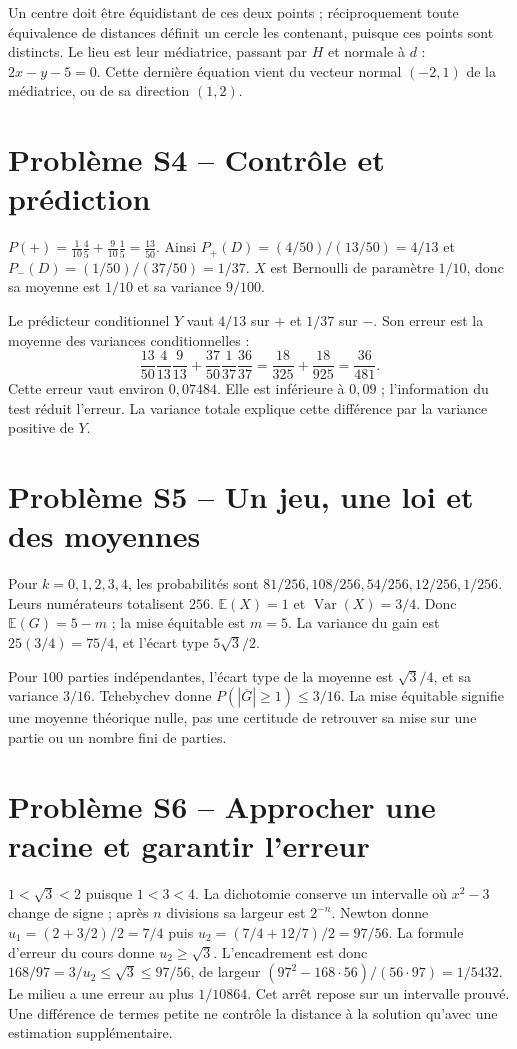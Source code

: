 Un centre doit être équidistant de ces deux points ; réciproquement toute
équivalence de distances définit un cercle les contenant, puisque ces points
sont distincts. Le lieu est leur médiatrice, passant par $H$ et normale à $d$ :
$2x-y-5=0$. Cette dernière équation vient du vecteur normal $(-2,1)$
de la médiatrice, ou de sa direction $(1,2)$.

\section*{Problème S4 -- Contrôle et prédiction}

$P(+)=\frac1{10}\frac45+\frac9{10}\frac15=\frac{13}{50}$.
Ainsi $P_+(D)=(4/50)/(13/50)=4/13$ et
$P_-(D)=(1/50)/(37/50)=1/37$.
$X$ est Bernoulli de paramètre $1/10$, donc sa moyenne est $1/10$
et sa variance $9/100$.

Le prédicteur conditionnel $Y$ vaut $4/13$ sur $+$ et $1/37$ sur $-$.
Son erreur est la moyenne des variances conditionnelles :
\[
\frac{13}{50}\frac4{13}\frac9{13}
+\frac{37}{50}\frac1{37}\frac{36}{37}
=\frac{18}{325}+\frac{18}{925}=\frac{36}{481}.
\]
Cette erreur vaut environ $0{,}07484$.
Elle est inférieure à $0{,}09$ ; l'information du test réduit l'erreur.
La variance totale explique cette différence par la variance positive de $Y$.

\section*{Problème S5 -- Un jeu, une loi et des moyennes}

Pour $k=0,1,2,3,4$, les probabilités sont
$81/256,108/256,54/256,12/256,1/256$.
Leurs numérateurs totalisent $256$.
$\mathbb E(X)=1$ et $\operatorname{Var}(X)=3/4$.
Donc $\mathbb E(G)=5-m$ ; la mise équitable est $m=5$.
La variance du gain est $25(3/4)=75/4$, et l'écart type $5\sqrt3/2$.

Pour $100$ parties indépendantes, l'écart type de la moyenne est
$\sqrt3/4$, et sa variance $3/16$.
Tchebychev donne $P(|\overline G|\ge1)\le3/16$.
La mise équitable signifie une moyenne théorique nulle, pas une certitude
de retrouver sa mise sur une partie ou un nombre fini de parties.

\section*{Problème S6 -- Approcher une racine et garantir l'erreur}

$1<\sqrt3<2$ puisque $1<3<4$. La dichotomie conserve un intervalle
où $x^2-3$ change de signe ; après $n$ divisions sa largeur est $2^{-n}$.
Newton donne $u_1=(2+3/2)/2=7/4$ puis
$u_2=(7/4+12/7)/2=97/56$.
La formule d'erreur du cours donne $u_2\ge\sqrt3$.
L'encadrement est donc
$168/97=3/u_2\le\sqrt3\le97/56$,
de largeur $(97^2-168\cdot56)/(56\cdot97)=1/5432$.
Le milieu a une erreur au plus $1/10864$.
Cet arrêt repose sur un intervalle prouvé. Une différence de termes petite
ne contrôle la distance à la solution qu'avec une estimation supplémentaire.

